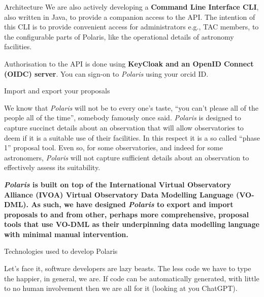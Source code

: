 \documentclass[final]{beamer}
\newlength{\colwidth}
\begin{document}
\begin{frame}[t]
\begin{columns}[t]
\begin{column}{\colwidth}
\begin{block}{Architecture}
                    We are also actively developing a \textbf{Command Line Interface CLI}, also written in Java, to
                    provide a companion access to the API. The intention of this CLI is to provide convenient access
                    for administrators e.g., TAC members, to the configurable parts of Polaris, like the operational
                    details of astronomy facilities.

                    Authorisation to the API is done using \textbf{KeyCloak and an OpenID Connect (OIDC) server}.
                    You can sign-on to \emph{Polaris} using your orcid ID\@.

                \end{block}

                \begin{alertblock}{Import and export your proposals}

                    We know that \emph{Polaris} will not be to every one's taste,
                    ``you can't please all of the people all of the time'', somebody famously once said.
                    \emph{Polaris} is designed to capture succinct details about an observation
                    that will allow observatories to deem if it is a suitable use of their facilities.
                    In this respect it is a so called ``phase 1'' proposal tool.
                    Even so, for some observatories, and indeed for some astronomers, \emph{Polaris} will not
                    capture sufficient details about an observation to effectively assess its suitability.

                    \textbf{\emph{Polaris} is built on top of the International Virtual Observatory Alliance (IVOA)
                        Virtual Observatory Data Modelling Language (VO-DML).
                        As such, we have designed \emph{Polaris} to export and import proposals to and from other,
                        perhaps more comprehensive, proposal tools that use VO-DML as their underpinning data modelling
                        language with minimal manual intervention.
                    }

                \end{alertblock}

                \begin{block}{Technologies used to develop Polaris}

                    Let's face it, software developers are lazy beasts.
                    The less code we have to type the happier, in general, we are.
                    If code can be automatically generated, with little to no human involvement then we are
                    all for it (looking at you ChatGPT).


\end{block}
\end{column}
\end{columns}
\end{frame}
\end{document}
